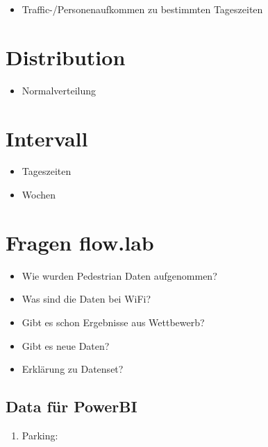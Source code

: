 \documentclass[11pt]{article}
\providecommand{\tightlist}{%
      \setlength{\itemsep}{0pt}\setlength{\parskip}{0pt}}
\begin{document}
\begin{itemize}
\tightlist
\item
  Traffic-/Personenaufkommen zu bestimmten Tageszeiten
\end{itemize}

\section{Distribution}\label{distribution}

\begin{itemize}
\tightlist
\item
  Normalverteilung
\end{itemize}

\section{Intervall}\label{intervall}

\begin{itemize}
\tightlist
\item
  Tageszeiten
\item
  Wochen
\end{itemize}

\section{Fragen flow.lab}\label{fragen-flow.lab}

\begin{itemize}
\tightlist
\item
  Wie wurden Pedestrian Daten aufgenommen?
\item
  Was sind die Daten bei WiFi?
\item
  Gibt es schon Ergebnisse aus Wettbewerb?
\item
  Gibt es neue Daten?
\item
  Erklärung zu Datenset?
\end{itemize}

    \subsection{Data für PowerBI}\label{data-fuxfcr-powerbi}

\begin{enumerate}
\def\labelenumi{\arabic{enumi}.}
\tightlist
\item
  Parking:
\end{enumerate}
\end{document}
